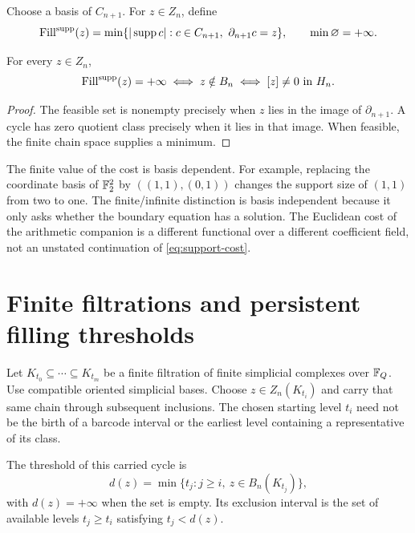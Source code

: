 \documentclass[11pt,a4paper]{article}
\begin{document}
Choose a basis of $C_{n+1}$.  For $z\in Z_n$, define
\begin{equation}\label{eq:support-cost}
 \operatorname{Fill}^{\mathrm{supp}}(z)
 =\min\{|\operatorname{supp} c|:c\in C_{n+1},\ \partial_{n+1}c=z\},
 \qquad\min\varnothing=+\infty.
\end{equation}

\begin{proposition}\label{prop:boundary}
For every $z\in Z_n$,
\[
 \operatorname{Fill}^{\mathrm{supp}}(z)=+\infty
 \iff z\notin B_n
 \iff[z]\ne0\text{ in }H_n.
\]
\end{proposition}

\begin{proof}
The feasible set is nonempty precisely when $z$ lies in the image of
$\partial_{n+1}$.  A cycle has zero quotient class precisely when it lies
in that image.  When feasible, the finite chain space supplies a minimum.
\end{proof}

The finite value of the cost is basis dependent.  For example, replacing
the coordinate basis of $\mathbb F_2^2$ by $((1,1),(0,1))$ changes the support
size of $(1,1)$ from two to one.  The finite/infinite distinction is
basis independent because it only asks whether the boundary equation has
a solution.  The Euclidean cost of the arithmetic companion is a
different functional over a different coefficient field, not an
unstated continuation of \cref{eq:support-cost}.

\section{Finite filtrations and persistent filling thresholds}
\label{sec:persistence}

Let $K_{t_0}\subseteq\cdots\subseteq K_{t_m}$ be a finite filtration of
finite simplicial complexes over $\mathbb F_Q$.  Use compatible oriented
simplicial bases.  Choose $z\in Z_n(K_{t_i})$ and carry that same chain
through subsequent inclusions.  The chosen starting level $t_i$ need not
be the birth of a barcode interval or the earliest level containing a
representative of its class.

\begin{definition}\label{def:threshold}
The threshold of this carried cycle is
\[
 d(z)=\min\{t_j:j\geq i,\ z\in B_n(K_{t_j})\},
\]
with $d(z)=+\infty$ when the set is empty.  Its exclusion interval is the
set of available levels $t_j\geq t_i$ satisfying $t_j<d(z)$.
\end{definition}
\end{document}
